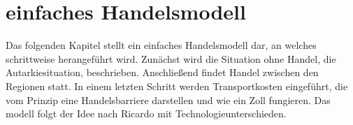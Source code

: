 




%

\chapter{einfaches Handelsmodell}
Das folgenden Kapitel stellt ein einfaches Handelsmodell dar, an welches schrittweise herangef{\"u}hrt wird. Zun{\"a}chst wird die Situation ohne Handel, die Autarkiesituation, beschrieben. Anschlie{\ss}end findet Handel zwischen den Regionen statt. In einem letzten Schritt werden Transportkosten eingef{\"u}hrt, die vom Prinzip eine Handelsbarriere darstellen und wie ein Zoll fungieren.  Das modell folgt der Idee   nach Ricardo mit Technologieunterschieden.

